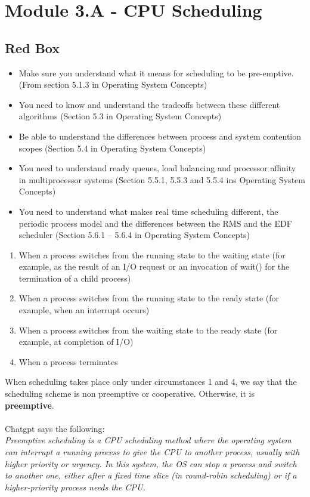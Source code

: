 \documentclass{article}
\begin{document}
\section{Module 3.A - CPU Scheduling}
\subsection{Red Box}
\begin{itemize}
    \item Make sure you understand what it means for scheduling to be pre-emptive.
    (From section 5.1.3 in Operating System Concepts)
    \item You need to know and understand the tradeoffs between these different algorithms
    (Section 5.3 in Operating System Concepts)
    \item Be able to understand the differences between process and system contention scopes
    (Section 5.4 in Operating System Concepts)
    \item You need to understand ready queues, load balancing and processor affinity in multiprocessor systems
    (Section 5.5.1, 5.5.3 and 5.5.4 ins Operating System Concepts)
    \item You need to understand what makes real time scheduling different, the periodic process model and the
    differences between the RMS and the EDF scheduler (Section 5.6.1 – 5.6.4 in Operating System Concepts)
\end{itemize}

\begin{enumerate}
    \item When a process switches from the running state to the waiting state (for
    example, as the result of an I/O request or an invocation of wait() for the
    termination of a child process)
    \item When a process switches from the running state to the ready state (for
    example, when an interrupt occurs)
    \item When a process switches from the waiting state to the ready state (for
    example, at completion of I/O)
    \item When a process terminates
\end{enumerate}

When scheduling takes place only under circumstances 1 and 4, we say that the scheduling scheme is non preemptive or cooperative.
Otherwise, it is {\bf preemptive}. 
\\
\\
Chatgpt says the following:
\\ {\it Preemptive scheduling is a CPU scheduling method where the operating system can interrupt a running process to give the CPU to another process, usually with higher priority or urgency.
In this system, the OS can stop a process and switch to another one, either after a fixed time slice (in round-robin scheduling) or if a higher-priority process needs the CPU.}
\end{document}
